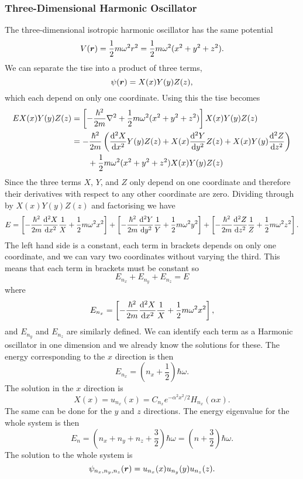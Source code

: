     \subsubsection{Three-Dimensional Harmonic Oscillator}
    The three-dimensional isotropic harmonic oscillator has the same potential
    \[V(\bm{r}) = \frac{1}{2}m\omega^2r^2 = \frac{1}{2}m\omega^2(x^2 + y^2 + z^2).\]
    We can separate the \gls{tise} into a product of three terms,
    \[\psi(\bm{r}) = X(x)Y(y)Z(z),\]
    which each depend on only one coordinate.
    Using this the \gls{tise} becomes
    \begin{align*}
        EX(x)Y(y)Z(z) &= \left[-\frac{\hbar^2}{2m}\nabla^2 + \frac{1}{2}m\omega^2(x^2 + y^2 + z^2)\right]X(x)Y(y)Z(z)\\
        &= -\frac{\hbar^2}{2m}\left(\dv[2]{X}{x}Y(y)Z(z) + X(x)\dv[2]{Y}{y}Z(z) + X(x)Y(y)\dv[2]{Z}{z}\right) \\
        &\qquad+ \frac{1}{2}m\omega^2(x^2 + y^2 + z^2)X(x)Y(y)Z(z)
    \end{align*}
    Since the three terms \(X\), \(Y\), and \(Z\) only depend on one coordinate and therefore their derivatives with respect to any other coordinate are zero.
    Dividing through by \(X(x)Y(y)Z(z)\) and factorising we have
    \[E = \left[-\frac{\hbar^2}{2m}\dv[2]{X}{x}\frac{1}{X} + \frac{1}{2}m\omega^2x^2\right] + \left[-\frac{\hbar^2}{2m}\dv[2]{Y}{y}\frac{1}{Y} + \frac{1}{2}m\omega^2y^2\right] + \left[-\frac{\hbar^2}{2m}\dv[2]{Z}{z}\frac{1}{Z} + \frac{1}{2}m\omega^2z^2\right].\]
    The left hand side is a constant, each term in brackets depends on only one coordinate, and we can vary two coordinates without varying the third.
    This means that each term in brackets must be constant so
    \[E_{n_x} + E_{n_y} + E_{n_z} = E\]
    where
    \[E_{n_x} = \left[-\frac{\hbar^2}{2m}\dv[2]{X}{x}\frac{1}{X} + \frac{1}{2}m\omega^2x^2\right],\]
    and \(E_{n_y}\) and \(E_{n_z}\) are similarly defined.
    We can identify each term as a Harmonic oscillator in one dimension and we already know the solutions for these.
    The energy corresponding to the \(x\) direction is then
    \[E_{n_x} = \left(n_x + \frac{1}{2}\right)\hbar\omega.\]
    The solution in the \(x\) direction is
    \[X(x) = u_{n_x}(x) = C_{n_x}e^{-\alpha^2x^2/2}H_{n_x}(\alpha x).\]
    The same can be done for the \(y\) and \(z\) directions.
    The energy eigenvalue for the whole system is then
    \[E_n = \left(n_x + n_y + n_z + \frac{3}{2}\right)\hbar\omega = \left(n + \frac{3}{2}\right)\hbar\omega.\]
    The solution to the whole system is
    \[\psi_{n_x,n_y,n_z}(\bm{r}) = u_{n_x}(x)u_{n_y}(y)u_{n_z}(z).\]
    
